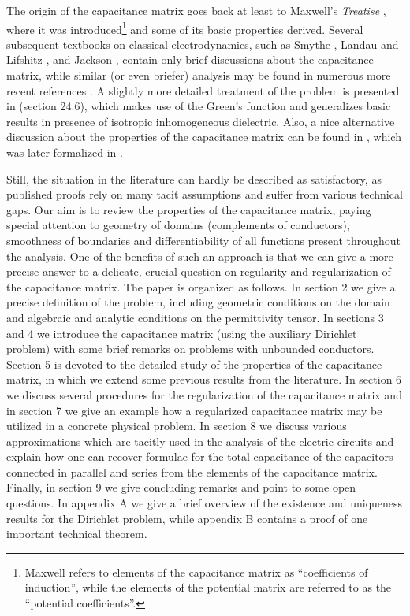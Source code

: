 \documentclass[12pt]{iopart}
\newcommand{\0}{\vct{0}}
\theoremstyle{plain} \newtheorem{tm}{Theorem}[section]
\theoremstyle{plain} \newtheorem{lm}[tm]{Lemma}
\theoremstyle{definition} \newtheorem{defn}[tm]{Definition}
\begin{document}
The origin of the capacitance matrix goes back at least to Maxwell's \emph{Treatise} \cite{Maxwell}, where it was introduced\footnote{Maxwell refers to elements of the capacitance matrix as ``coefficients of induction'', while the elements of the potential matrix are referred to as the ``potential coefficients''.} and some of its basic properties derived. Several subsequent textbooks on classical electrodynamics, such as Smythe \cite{Smythe}, Landau and Lifshitz \cite{LLED}, and Jackson \cite{Jack}, contain only brief discussions about the capacitance matrix, while similar (or even briefer) analysis may be found in numerous more recent references \cite{CPK,Schwartz,Wangsness,NB,Ohanian,Greiner,PP,Muller,Vanderlinde,Zangwill,Garg,Toptygin}. A slightly more detailed treatment of the problem is presented in \cite{SDeRMTN} (section 24.6), which makes use of the Green's function and generalizes basic results in presence of isotropic inhomogeneous dielectric. Also, a nice alternative discussion about the properties of the capacitance matrix can be found in \cite{HD08}, which was later formalized in \cite{HD11}. 

Still, the situation in the literature can hardly be described as satisfactory, as published proofs rely on many tacit assumptions and suffer from various technical gaps. Our aim is to review the properties of the capacitance matrix, paying special attention to geometry of domains (complements of conductors), smoothness of boundaries and differentiability of all functions present throughout the analysis. One of the benefits of such an approach is that we can give a more precise answer to a delicate, crucial question on regularity and regularization of the capacitance matrix. The paper is organized as follows. In section 2 we give a precise definition of the problem, including geometric conditions on the domain and algebraic and analytic conditions on the permittivity tensor. In sections 3 and 4 we introduce the capacitance matrix (using the auxiliary Dirichlet problem) with some brief remarks on problems with unbounded conductors. Section 5 is devoted to the detailed study of the properties of the capacitance matrix, in which we extend some previous results from the literature. In section 6 we discuss several procedures for the regularization of the capacitance matrix and in section 7 we give an example how a regularized capacitance matrix may be utilized in a concrete physical problem. In section 8 we discuss various approximations which are tacitly used in the analysis of the electric circuits and explain how one can recover formulae for the total capacitance of the capacitors connected in parallel and series from the elements of the capacitance matrix. Finally, in section 9 we give concluding remarks and point to some open questions. In appendix A we give a brief overview of the existence and uniqueness results for the Dirichlet problem, while appendix B contains a proof of one important technical theorem. 
\end{document}

